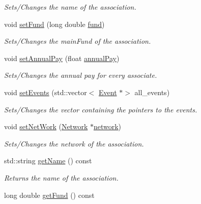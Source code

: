 \begin{DoxyCompactItemize}
\begin{DoxyCompactList}\small\item\em Sets/\+Changes the name of the association. \end{DoxyCompactList}\item 
void \mbox{\hyperlink{classAssociation_acbeba5c80457ba1c307c212bcad08b82}{set\+Fund}} (long double \mbox{\hyperlink{classAssociation_a891f18ca3dbbbdfa2e8fab54b1683133}{fund}})
\begin{DoxyCompactList}\small\item\em Sets/\+Changes the main\+Fund of the association. \end{DoxyCompactList}\item 
void \mbox{\hyperlink{classAssociation_a4279bd391a3110e4110d3f300b3423a3}{set\+Annual\+Pay}} (float \mbox{\hyperlink{classAssociation_a19f8a7aad1491bc14f558b0b852da0a4}{annual\+Pay}})
\begin{DoxyCompactList}\small\item\em Sets/\+Changes the annual pay for every associate. \end{DoxyCompactList}\item 
void \mbox{\hyperlink{classAssociation_a5611bc364e24e70f110332d1b2c63a08}{set\+Events}} (std\+::vector$<$ \mbox{\hyperlink{classEvent}{Event}} $\ast$$>$ all\+\_\+events)
\begin{DoxyCompactList}\small\item\em Sets/\+Changes the vector containing the pointers to the events. \end{DoxyCompactList}\item 
void \mbox{\hyperlink{classAssociation_afa9bdcebf905cddc52870dd156a14d54}{set\+Net\+Work}} (\mbox{\hyperlink{classNetwork}{Network}} $\ast$\mbox{\hyperlink{classAssociation_a6747cedd4ce14a3b890c8ac87f676192}{network}})
\begin{DoxyCompactList}\small\item\em Sets/\+Changes the network of the association. \end{DoxyCompactList}\item 
std\+::string \mbox{\hyperlink{classAssociation_ab9b849706f996d80ed3439d43d06a958}{get\+Name}} () const
\begin{DoxyCompactList}\small\item\em Returns the name of the association. \end{DoxyCompactList}\item 
long double \mbox{\hyperlink{classAssociation_a4834d8fe0057ca4c55fa3e83bc47aae5}{get\+Fund}} () const
$$
\end{DoxyCompactItemize}
